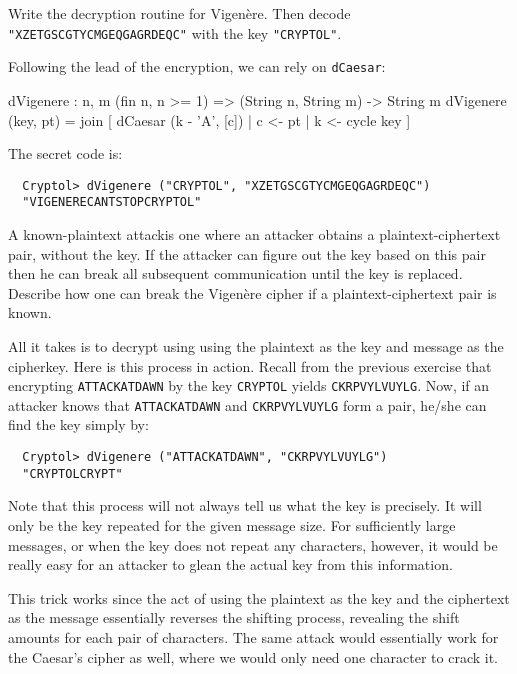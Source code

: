 \begin{Exercise}\label{ex:vigenere:2}
  Write the decryption routine for Vigen\`{e}re. Then decode \\
  {\tt "XZETGSCGTYCMGEQGAGRDEQC"} with the key {\tt "CRYPTOL"}.
\end{Exercise}
\begin{Answer}
Following the lead of the encryption, we can rely on {\tt dCaesar}:
\begin{code}
  dVigenere : {n, m} (fin n, n >= 1) => 
              (String n, String m) -> String m
  dVigenere (key, pt) = join [ dCaesar (k - 'A', [c]) 
                               | c <- pt
                               | k <- cycle key
                             ]
\end{code}
The secret code is:
\begin{Verbatim}
  Cryptol> dVigenere ("CRYPTOL", "XZETGSCGTYCMGEQGAGRDEQC")
  "VIGENERECANTSTOPCRYPTOL"
\end{Verbatim}
\end{Answer}

\begin{Exercise}\label{ex:vigenere:3}
  A known-plaintext attack\indKnownPTAttack is one where an attacker
  obtains a plaintext-ciphertext pair, without the key. If the
  attacker can figure out the key based on this pair then he can break
  all subsequent communication until the key is replaced. Describe how
  one can break the Vigen\`{e}re cipher if a plaintext-ciphertext pair
  is known.
\end{Exercise}
\begin{Answer}
  All it takes is to decrypt using using the plaintext as the key and
  message as the cipherkey. Here is this process in action. Recall
  from the previous exercise that encrypting {\tt ATTACKATDAWN} by the
  key {\tt CRYPTOL} yields {\tt CKRPVYLVUYLG}. Now, if an attacker
  knows that {\tt ATTACKATDAWN} and {\tt CKRPVYLVUYLG} form a pair,
  he/she can find the key simply by:\indVigenere
\begin{Verbatim}
  Cryptol> dVigenere ("ATTACKATDAWN", "CKRPVYLVUYLG")
  "CRYPTOLCRYPT"
\end{Verbatim}
Note that this process will not always tell us what the key is
precisely.  It will only be the key repeated for the given message
size. For sufficiently large messages, or when the key does not repeat
any characters, however, it would be really easy for an attacker to
glean the actual key from this information.

This trick works since the act of using the plaintext as the key and
the ciphertext as the message essentially reverses the shifting
process, revealing the shift amounts for each pair of characters.  The
same attack would essentially work for the Caesar's cipher as well,
where we would only need one character to crack it.\indCaesarscipher
\end{Answer}

